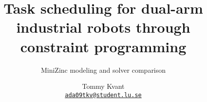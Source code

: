 \documentclass{cslthse-msc}
\author{
	Tommy Kvant \\
	{\normalsize \href{mailto:ada09tkv@student.lu.se}{\texttt{ada09tkv@student.lu.se}}}
}
\title{Task scheduling for dual-arm industrial robots through constraint programming}
\subtitle{MiniZinc modeling and solver comparison}
\begin{document}
\makefrontmatter









\begin{appendices}


\end{appendices}
\end{document}
